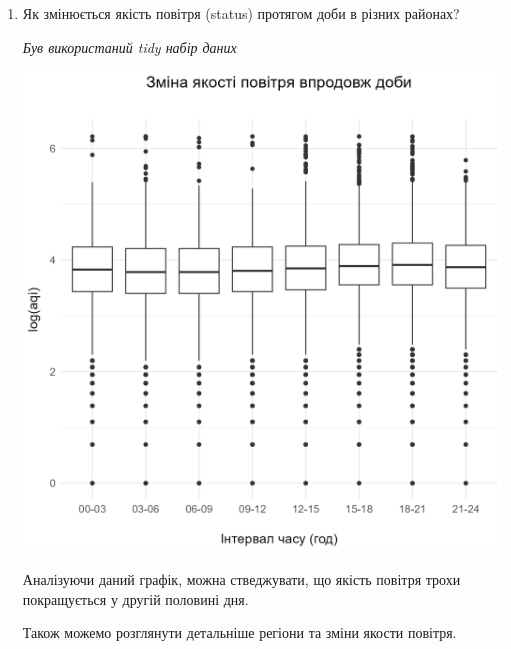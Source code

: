 \documentclass[./report.tex]{subfiles}
\begin{document}
\begin{enumerate}
  \pagebreak

  \item Як змінюється якість повітря (status) протягом доби в різних районах?

  \quad \textit{Був використаний tidy набір даних}

  \includegraphics[width=\linewidth]{plots/question3/box.png}

  Аналізуючи даний графік, можна стведжувати, що якість повітря трохи
  покращується у другій половині дня.

  \pagebreak

  Також можемо розглянути детальніше регіони та зміни якости повітря.


\end{enumerate}
\end{document}
